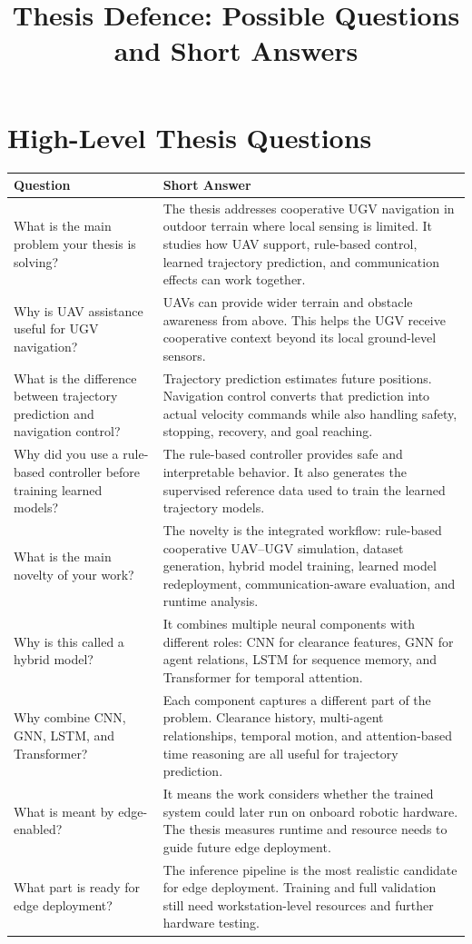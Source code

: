 \documentclass[11pt,a4paper]{article}
\title{Thesis Defence: Possible Questions and Short Answers}
\date{}
\begin{document}
\maketitle

\section*{High-Level Thesis Questions}
\begin{longtable}{QA}
\toprule
\textbf{Question} & \textbf{Short Answer} \\
\midrule
\endhead
What is the main problem your thesis is solving? &
The thesis addresses cooperative UGV navigation in outdoor terrain where local sensing is limited. It studies how UAV support, rule-based control, learned trajectory prediction, and communication effects can work together. \\
\addlinespace
Why is UAV assistance useful for UGV navigation? &
UAVs can provide wider terrain and obstacle awareness from above. This helps the UGV receive cooperative context beyond its local ground-level sensors. \\
\addlinespace
What is the difference between trajectory prediction and navigation control? &
Trajectory prediction estimates future positions. Navigation control converts that prediction into actual velocity commands while also handling safety, stopping, recovery, and goal reaching. \\
\addlinespace
Why did you use a rule-based controller before training learned models? &
The rule-based controller provides safe and interpretable behavior. It also generates the supervised reference data used to train the learned trajectory models. \\
\addlinespace
What is the main novelty of your work? &
The novelty is the integrated workflow: rule-based cooperative UAV--UGV simulation, dataset generation, hybrid model training, learned model redeployment, communication-aware evaluation, and runtime analysis. \\
\addlinespace
Why is this called a hybrid model? &
It combines multiple neural components with different roles: CNN for clearance features, GNN for agent relations, LSTM for sequence memory, and Transformer for temporal attention. \\
\addlinespace
Why combine CNN, GNN, LSTM, and Transformer? &
Each component captures a different part of the problem. Clearance history, multi-agent relationships, temporal motion, and attention-based time reasoning are all useful for trajectory prediction. \\
\addlinespace
What is meant by edge-enabled? &
It means the work considers whether the trained system could later run on onboard robotic hardware. The thesis measures runtime and resource needs to guide future edge deployment. \\
\addlinespace
What part is ready for edge deployment? &
The inference pipeline is the most realistic candidate for edge deployment. Training and full validation still need workstation-level resources and further hardware testing. \\
\bottomrule
\end{longtable}
\end{document}
